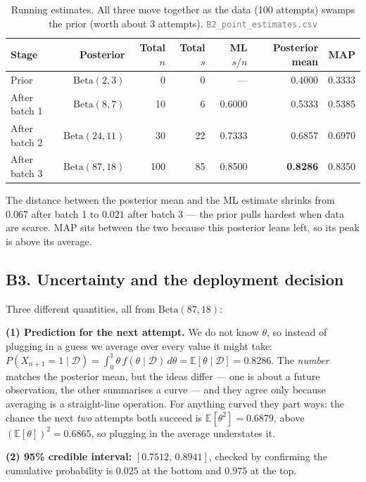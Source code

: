 \documentclass[12pt,a4paper]{article}
\newcommand{\D}{\mathcal{D}}
\newcommand{\file}[1]{\textcolor{gray}{\small\texttt{#1}}}
\begin{document}
\begin{table}[H]\centering\small
\caption{Running estimates. All three move together as the data (100 attempts) swamps the prior
(worth about 3 attempts). \file{B2\_point\_estimates.csv}}
\label{tab:Bpoint}
\begin{tabular}{lrrrrrr}
\toprule
Stage & Posterior & Total $n$ & Total $s$ & ML $s/n$ & Posterior mean & MAP \\
\midrule
Prior & $\mathrm{Beta}(2,3)$ & 0 & 0 & --- & 0.4000 & 0.3333 \\
After batch 1 & $\mathrm{Beta}(8,7)$ & 10 & 6 & 0.6000 & 0.5333 & 0.5385 \\
After batch 2 & $\mathrm{Beta}(24,11)$ & 30 & 22 & 0.7333 & 0.6857 & 0.6970 \\
After batch 3 & $\mathrm{Beta}(87,18)$ & 100 & 85 & 0.8500 & \textbf{0.8286} & 0.8350 \\
\bottomrule
\end{tabular}
\end{table}

The distance between the posterior mean and the ML estimate shrinks from $0.067$ after batch 1 to $0.021$ after
batch 3 --- the prior pulls hardest when data are scarce. MAP sits between the two because this posterior leans
left, so its peak is above its average.

\subsection{B3. Uncertainty and the deployment decision}

Three different quantities, all from $\mathrm{Beta}(87,18)$:

\textbf{(1) Prediction for the next attempt.} We do not know $\theta$, so instead of plugging in a guess we
average over every value it might take:
$P(X_{n+1}{=}1\mid\D)=\int_0^1\theta\,f(\theta\mid\D)\,d\theta=\mathbb{E}[\theta\mid\D]=\mathbf{0.8286}$. The
\emph{number} matches the posterior mean, but the ideas differ --- one is about a future observation, the other
summarises a curve --- and they agree only because averaging is a straight-line operation. For anything curved
they part ways: the chance the next \emph{two} attempts both succeed is $\mathbb{E}[\theta^2]=0.6879$, above
$(\mathbb{E}[\theta])^2=0.6865$, so plugging in the average understates it.

\textbf{(2) 95\% credible interval:} $[\mathbf{0.7512},\,\mathbf{0.8941}]$, checked by confirming the cumulative
probability is $0.025$ at the bottom and $0.975$ at the top.
\end{document}
